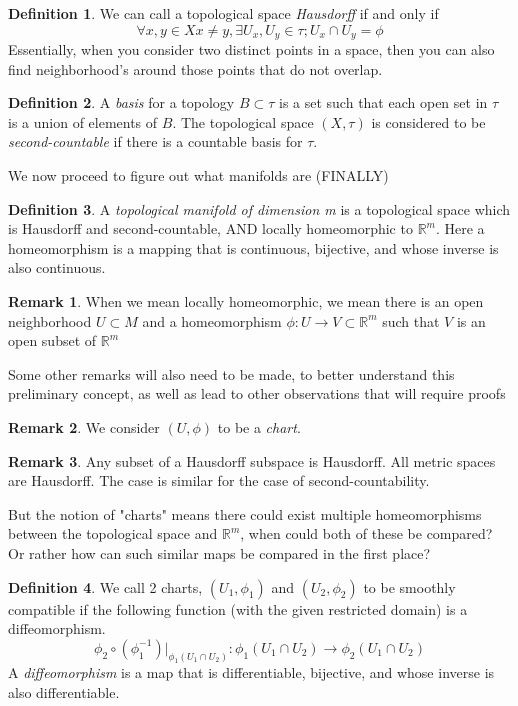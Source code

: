 \documentclass[12pt]{book}
\theoremstyle{definition}
\newtheorem*{definition}{Definition}
\newtheorem*{remark}{Remark}
\begin{document}
\begin{definition}
    We can call a topological space \textit{Hausdorff} if and only if $$\forall x, y \in X x \neq y, \exists U_x, U_y \in \tau; U_x \cap U_y = \phi$$
    Essentially, when you consider two distinct points in a space, then you can also find neighborhood's around those points that do not overlap. 
\end{definition}
\begin{definition}
    A \textit{basis} for a topology $B \subset \tau$ is a set such that each open set in $\tau$ is a union of elements of $B$. The topological space $(X, \tau)$ is considered to be \textit{second-countable} if there is a countable basis for $\tau$.
\end{definition}
We now proceed to figure out what manifolds are (FINALLY)
\begin{definition}
    A \textit{topological manifold of dimension m} is a topological space which is Hausdorff and second-countable, AND locally homeomorphic to $\mathbb{R}^m$. Here a homeomorphism is a mapping that is continuous, bijective, and whose inverse is also continuous.
\end{definition}
\begin{remark}
    When we mean locally homeomorphic, we mean there is an open neighborhood $U \subset M$ and a homeomorphism $\phi: U \to V \subset \mathbb{R}^m$ such that $V$ is an open subset of  $\mathbb{R}^m$
\end{remark}
Some other remarks will also need to be made, to better understand this preliminary concept, as well as lead to other observations that will require proofs
\begin{remark}
    We consider $(U, \phi)$ to be a \textit{chart}. 
\end{remark}
\begin{remark}
    Any subset of a Hausdorff subspace is Hausdorff. All metric spaces are Hausdorff. The case is similar for the case of second-countability.
\end{remark}
But the notion of "charts" means there could exist multiple homeomorphisms between the topological space and $\mathbb{R}^m$, when could both of these be compared? Or rather how can such similar maps be compared in the first place?
\begin{definition}
    We call 2 charts, $(U_1, \phi_1)$ and $(U_2, \phi_2)$ to be smoothly compatible if the following function (with the given restricted domain) is a diffeomorphism.
    $$\phi_2 \circ (\phi_1^{-1})|_{\phi_1 (U_1 \cap U_2)}: \phi_1(U_1 \cap U_2) \to \phi_2(U_1 \cap U_2)$$
    A \textit{diffeomorphism} is a map that is differentiable, bijective, and whose inverse is also differentiable.
\end{definition}
\end{document}
